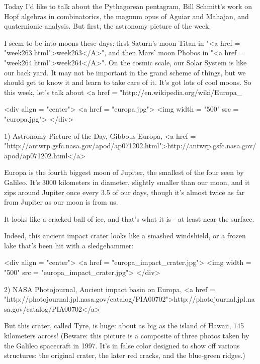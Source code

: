 



Today I'd like to talk about the Pythagorean pentagram, Bill Schmitt's
work on Hopf algebras 
in combinatorics, the magnum opus of Aguiar and Mahajan, and 
quaternionic analysis.  But first, the astronomy picture of the week.

I seem to be into moons these days: first Saturn's moon Titan in
"<a href = "week263.html">week263</A>", and then Mars' moon
Phobos in "<a href = "week264.html">week264</A>".  On the
cosmic scale, our Solar System is like our back yard.  It may not be
important in the grand scheme of things, but we should get to know it
and learn to take care of it.  It's got lots of cool moons.  So this
week, let's talk about <a href =
"http://en.wikipedia.org/wiki/Europa_%

<div align = "center">
<a href = "europa.jpg">
<img width = "500" src = "europa.jpg">
</div>

1) Astronomy Picture of the Day, Gibbous Europa, 
<a href = "http://antwrp.gsfc.nasa.gov/apod/ap071202.html">http://antwrp.gsfc.nasa.gov/apod/ap071202.html</a>

Europa is the fourth biggest moon of Jupiter, the smallest of the four
seen by Galileo.  It's 3000 kilometers in diameter, slightly smaller 
than our moon, and it zips around Jupiter once every 3.5 of our days, 
though it's almost twice as far from Jupiter as our moon is from us.

It looks like a cracked ball of ice, and that's what it is - at
least near the surface.  

Indeed, this ancient impact crater looks like a smashed 
windshield, or a frozen lake that's been hit with a sledgehammer:  

<div align = "center">
<a href = "europa_impact_crater.jpg">
<img width = "500" src = "europa_impact_crater.jpg">
</div>

2) NASA Photojournal, Ancient impact basin on Europa, 
<a href = "http://photojournal.jpl.nasa.gov/catalog/PIA00702">http://photojournal.jpl.nasa.gov/catalog/PIA00702</a>

But this crater, called Tyre, is huge: about as big as the island
of Hawaii, 145 kilometers across!  (Beware: this picture is a composite of 
three photos taken by the Galileo spacecraft in 1997.  It's in false 
color designed to show off various structures: the original crater, 
the later red cracks, and the blue-green ridges.)
 
